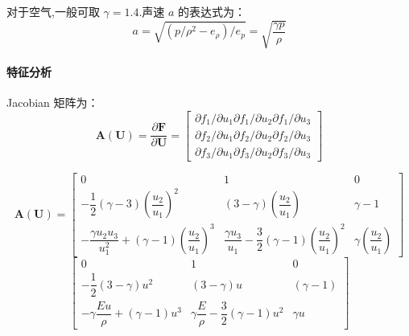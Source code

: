 \documentclass{book}
\begin{document}
对于空气,一般可取 $\gamma=1.4$.声速 $a$ 的表达式为：
\begin{equation}
    a=\sqrt{\left(p / \rho^{2}-e_{\rho}\right) / e_{p}}=\sqrt{\dfrac{\gamma p}{\rho}}
\end{equation}

\paragraph{特征分析}
Jacobian 矩阵为：
\begin{equation}
    \mathbf{A}(\mathbf{U})=\dfrac{\partial \mathbf{F}}{\partial \mathbf{U}}=\left[\begin{array}{l}
            \partial f_{1} / \partial u_{1} \partial f_{1} / \partial u_{2} \partial f_{1} / \partial u_{3} \\
            \partial f_{2} / \partial u_{1} \partial f_{2} / \partial u_{2} \partial f_{2} / \partial u_{3} \\
            \partial f_{3} / \partial u_{1} \partial f_{3} / \partial u_{2} \partial f_{3} / \partial u_{3}
        \end{array}\right]
\end{equation}

\begin{equation}
    \mathbf{A}(\mathbf{U})=\begin{bmatrix}
        0                                                                                      & 1                                                                                       & 0                                       \\
        -\dfrac{1}{2}(\gamma-3)\left(\dfrac{u_{2}}{u_{1}}\right)^{2}                           & (3-\gamma)\left(\dfrac{u_{2}}{u_{1}}\right)                                             & \gamma-1                                \\
        -\dfrac{\gamma u_{2} u_{3}}{u_{1}^{2}}+(\gamma-1)\left(\dfrac{u_{2}}{u_{1}}\right)^{3} & \dfrac{\gamma u_{3}}{u_{1}}-\dfrac{3}{2}(\gamma-1)\left(\dfrac{u_{2}}{u_{1}}\right)^{2} & \gamma\left(\dfrac{u_{2}}{u_{1}}\right)
    \end{bmatrix}
\end{equation}
\begin{equation}
    \begin{bmatrix}
        0                                          & 1                                                   & 0          \\
        -\dfrac{1}{2}(3-\gamma) u^{2}              & (3-\gamma) u                                        & (\gamma-1) \\
        -\gamma \dfrac{E u}{\rho}+(\gamma-1) u^{3} & \gamma \dfrac{E}{\rho}-\dfrac{3}{2}(\gamma-1) u^{2} & \gamma u
    \end{bmatrix}
\end{equation}
\end{document}
